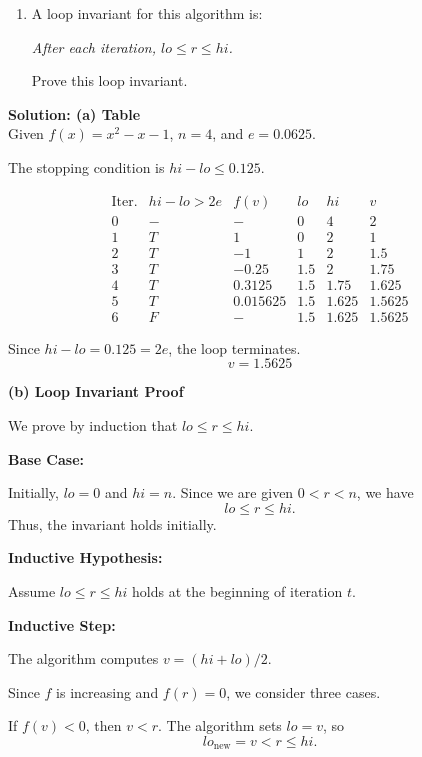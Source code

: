 \documentclass[10pt,letterpaper,unboxed,cm]{article}
\begin{document}
\begin{enumerate}
\begin{enumerate}
\begin{quote}
{\bf return} $0.5625$

\end{quote}

\item
A loop invariant for this algorithm is:
\begin{center}
\emph{After each iteration, $lo\leq r\leq hi$.}
\end{center}

Prove this loop invariant.

\end{enumerate}

\textbf{Solution: (a) Table }\\
Given $f(x)=x^2-x-1$, $n=4$, and $e=0.0625$.

The stopping condition is $hi-lo \leq 0.125$.

\[
\begin{array}{c|c|c|c|c|c}
\text{Iter.} & hi-lo>2e & f(v) & lo & hi & v\\
\hline
0 & - & - & 0 & 4 & 2\\
1 & T & 1 & 0 & 2 & 1\\
2 & T & -1 & 1 & 2 & 1.5\\
3 & T & -0.25 & 1.5 & 2 & 1.75\\
4 & T & 0.3125 & 1.5 & 1.75 & 1.625\\
5 & T & 0.015625 & 1.5 & 1.625 & 1.5625\\
6 & F & - & 1.5 & 1.625 & 1.5625
\end{array}
\]

Since $hi-lo=0.125=2e$, the loop terminates.
\[\boxed{v=1.5625}\]

\textbf{(b) Loop Invariant Proof}

We prove by induction that $lo \leq r \leq hi$.

\textbf{Base Case:}

Initially, $lo=0$ and $hi=n$.
Since we are given $0<r<n$, we have
\[lo \leq r \leq hi.\]
Thus, the invariant holds initially.

\textbf{Inductive Hypothesis:}

Assume $lo \leq r \leq hi$ holds at the
beginning of iteration $t$.

\textbf{Inductive Step:}

The algorithm computes $v=(hi+lo)/2$.

Since $f$ is increasing and $f(r)=0$,
we consider three cases.

If $f(v)<0$, then $v<r$.
The algorithm sets $lo=v$, so
\[lo_{\text{new}}=v<r\leq hi.\]


\end{enumerate}
\end{document}
